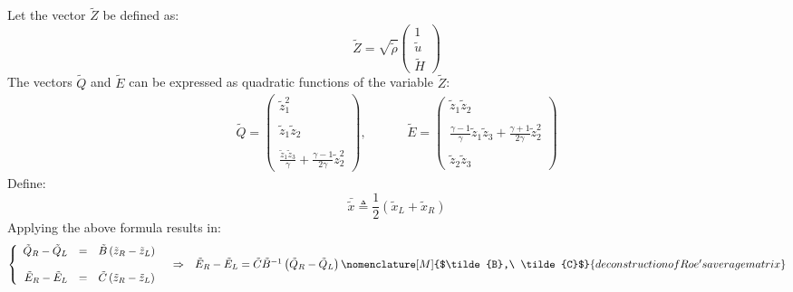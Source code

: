 \documentclass[11pt, a4paper]{article}
\begin{document}
Let the vector $\tilde{Z}$ be defined as:
\begin{equation*}
    \tilde{Z}=\sqrt{\tilde{\rho}}\begin{pmatrix}
        1 \\
        \tilde{u} \\
        \tilde{H}
    \end{pmatrix}
\end{equation*}
The vectors $\tilde{Q}$ and $\tilde{E}$ can be expressed as quadratic functions of the variable $\tilde{Z}$:
\begin{equation}
    \begin{matrix}
        \tilde{Q}=\begin{pmatrix}
            \tilde{z}_1^2 \\\\
            \tilde{z}_1\tilde{z}_2 \\\\
            \displaystyle\frac{\tilde{z}_1\tilde{z}_3}{\gamma}+\frac{\gamma-1}{2\gamma}\tilde{z}_2^2
        \end{pmatrix},\hspace{1cm} & \tilde{E}=\begin{pmatrix}
            \tilde{z}_1\tilde{z}_2 \\\\
            \displaystyle\frac{\gamma-1}{\gamma}\tilde{z}_1\tilde{z}_3+\frac{\gamma+1}{2\gamma}\tilde{z}_2^2 \\\\
            \tilde{z}_2\tilde{z}_3
        \end{pmatrix}
    \end{matrix}
\end{equation}
Define:
\begin{equation}
    \bar{\tilde{x}}\triangleq\frac{1}{2}\left(\tilde{x}_L+\tilde{x}_R\right)
\end{equation}
Applying the above formula results in:
\begin{equation}
    \begin{matrix}
        \left\{\begin{array}{rcl}
            \tilde{Q}_R-\tilde{Q}_L & = & \tilde{B}\left(\tilde{z}_R-\tilde{z}_L\right) \\\\
            \tilde{E}_R-\tilde{E}_L & = & \tilde{C}\left(\tilde{z}_R-\tilde{z}_L\right)
        \end{array}\right. & \Rightarrow & \tilde{E}_R-\tilde{E}_L=\tilde{C}\tilde{B}^{-1}\left(\tilde{Q}_R-\tilde{Q}_L\right)
        \nomenclature[M]{$\tilde{B},\ \tilde{C}$}{deconstruction of Roe's average matrix}
    \end{matrix}
\end{equation}
\end{document}
